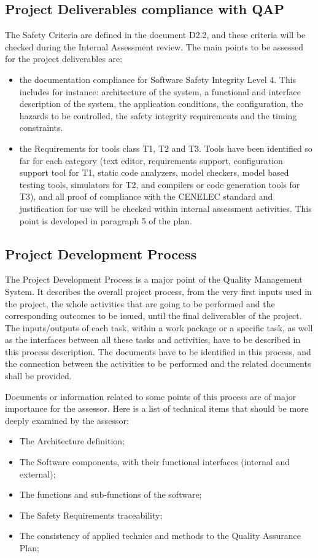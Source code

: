 \documentclass[openetcs]{template/openetcs_article}
\begin{document}
\subsection{Project Deliverables compliance with QAP}
The Safety Criteria are defined in the document D2.2, and these criteria will be checked during the Internal Assessment review. The main points to be assessed
for the project deliverables are:
\begin{itemize}
\item the documentation compliance for Software Safety Integrity Level 4. This includes for instance: architecture of the system, a functional and interface description of the system, the
application conditions, the configuration, the hazards to be controlled, the safety integrity requirements and the timing constraints.
\item the Requirements for tools class T1, T2 and T3. Tools have been identified so far for each category (text editor, requirements support, configuration
support tool for T1, static code analyzers, model checkers, model based testing tools, simulators for T2, and compilers or code generation tools for T3), and
all proof of compliance with the CENELEC standard and justification for use will be checked within internal assessment activities. This point is developed in
paragraph 5 of the plan.
\end{itemize}

\subsection{Project Development Process}
The Project Development Process is a major point of the Quality Management System. It describes the overall project process, from the very first inputs used in
the project, the whole activities that are going to be performed and the corresponding outcomes to be issued, until the final deliverables of the project. The
inputs/outputs of each task, within a work package or a specific task, as well as the interfaces between all these tasks and activities, have to be described in
this process description.
The documents have to be identified in this process, and the connection  between the activities to be performed and the related documents shall be provided.

Documents or information related to some points of this process are of major importance for the assessor. Here is a list of technical items that should be more deeply examined by the assessor:
\begin{itemize}
\item The Architecture definition;
\item The Software components, with their functional interfaces (internal and external);
\item The functions and sub-functions of the software;
\item The Safety Requirements traceability;
\item The consistency of applied technics and methods to the Quality Assurance Plan;
\end{itemize}
\end{document}

